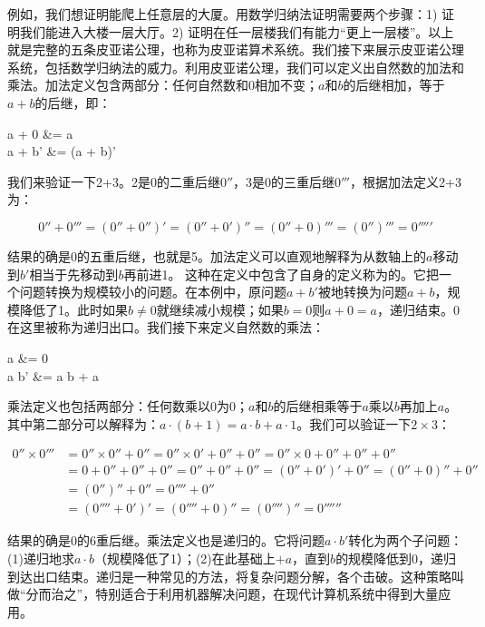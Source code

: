 \documentclass[b5paper]{ctexart}
\begin{document}
例如，我们想证明能爬上任意层的大厦。用数学归纳法证明需要两个步骤：1) 证明我们能进入大楼一层大厅。2) 证明在任一层楼我们有能力“更上一层楼”。以上就是完整的五条皮亚诺公理，也称为皮亚诺算术系统。我们接下来展示皮亚诺公理系统，包括数学归纳法的威力。利用皮亚诺公理，我们可以定义出自然数的加法和乘法。加法定义包含两部分：任何自然数和0相加不变；$a$和$b$的后继相加，等于$a + b$的后继，即：

\be
\begin{laligned}
a + 0  &= a \\
a + b' &= (a + b)'
\end{laligned}
\label{eq:peano-add}
\ee

我们来验证一下2+3。2是0的二重后继$0''$，3是0的三重后继$0'''$，根据加法定义2+3为：

\[
0'' + 0''' = (0'' + 0'')' = (0'' + 0')'' = (0'' + 0)''' = (0'')''' = 0'''''
\]

结果的确是0的五重后继，也就是5。加法定义可以直观地解释为从数轴上的$a$移动到$b'$相当于先移动到$b$再前进1。
这种在定义中包含了自身的定义称为的。它把一个问题转换为规模较小的问题。在本例中，原问题$a + b'$被地转换为问题$a + b$，规模降低了1。此时如果$b \ne 0$就继续减小规模；如果$b = 0$则$a + 0 = a$，递归结束。0在这里被称为递归出口。我们接下来定义自然数的乘法：

\be
\begin{laligned}
a  &= 0 \\
a \cdot b' &= a \cdot b + a
\end{laligned}
\label{eq:peano-multiply}
\ee

乘法定义也包括两部分：任何数乘以0为0；$a$和$b$的后继相乘等于$a$乘以$b$再加上$a$。其中第二部分可以解释为：$a \cdot (b+1) = a \cdot b + a \cdot 1$。我们可以验证一下$2 \times 3$：

\begin{align*}
0'' \times 0''' & = 0'' \times 0'' + 0'' = 0'' \times 0' + 0'' + 0'' = 0'' \times 0 + 0'' + 0'' + 0'' \\
                & = 0 + 0'' + 0'' + 0'' = 0'' + 0'' + 0'' = (0'' + 0')' + 0'' = (0'' + 0)'' + 0'' \\
                & = (0'')'' + 0'' = 0'''' + 0'' \\
                & = (0'''' + 0')' = (0'''' + 0)'' = (0'''')'' = 0''''''
\end{align*}

结果的确是0的6重后继。乘法定义也是递归的。它将问题$a \cdot b'$转化为两个子问题：(1)递归地求$a \cdot b$（规模降低了1）；(2)在此基础上$+a$，直到$b$的规模降低到0，递归到达出口结束。递归是一种常见的方法，将复杂问题分解，各个击破。这种策略叫做“分而治之”，特别适合于利用机器解决问题，在现代计算机系统中得到大量应用。
\end{document}
